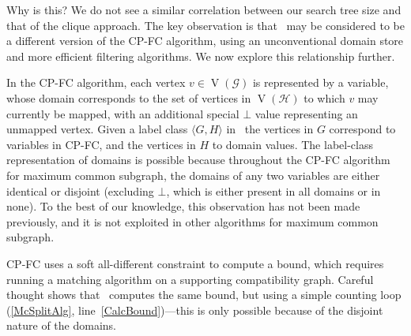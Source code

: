 \documentclass[letterpaper]{article}
\newcommand{\McSplit}{\textproc{McSplit}}
\newcommand{\graphG}{\mathcal{G}}
\newcommand{\graphH}{\mathcal{H}}
\newcommand{\setG}{G}
\newcommand{\setH}{H}
\newcommand{\lineref}[1]{line~\ref{#1}}
\newcommand{\linerangeref}[2]{\count255=\ref{#1}\advance\count255 by 1 \ifnum\count255=\ref{#2}lines~\ref{#1} and~\ref{#2}\else lines~\ref{#1} to~\ref{#2}\fi}
\DeclareMathOperator{\V}{V}
\DeclareMathOperator{\N}{N}
\DeclareMathOperator{\invN}{\overline{N}}
\begin{document}
Why is this? We do not see a similar correlation between our search tree size
and that of the clique approach. The key observation is that \McSplit\ may be
considered to be a different version of the CP-FC algorithm, using
an unconventional domain store and more efficient filtering algorithms. We now
explore this relationship further.

In the CP-FC algorithm, each vertex $v \in \V(\graphG)$ is represented by a
variable, whose domain corresponds to the set of vertices in $\V(\graphH)$ to
which $v$ may currently be mapped, with an additional special $\bot$ value
representing an unmapped vertex.  Given a label class $\langle \setG,\setH
\rangle$ in \McSplit\, the vertices in $\setG$ correspond to variables in
CP-FC, and the vertices in $\setH$ to domain values. The label-class
representation of domains is possible because throughout the CP-FC algorithm
for maximum common subgraph, the domains of any two variables are either
identical or disjoint (excluding $\bot$, which is either present in all domains or in none).
To the best of our knowledge, this observation has not been made previously,
and it is not exploited in other algorithms for maximum common subgraph.

CP-FC uses a soft all-different constraint to compute a bound, which requires
running a matching algorithm on a supporting compatibility graph.  Careful
thought shows that \McSplit\ computes the same bound, but using a simple
counting loop (\cref{McSplitAlg}, \lineref{CalcBound})---this is only possible
because of the disjoint nature of the domains.

\end{document}
